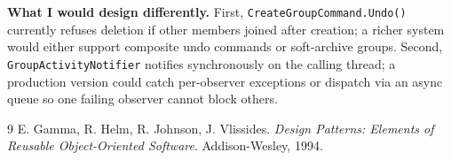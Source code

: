 \documentclass{utmreport}
\providecommand{\passthrough}[1]{#1}
\begin{document}
\textbf{What I would design differently.} First, \passthrough{\lstinline!CreateGroupCommand.Undo()!} currently refuses deletion if other members joined after creation; a richer system would either support composite undo commands or soft-archive groups. Second, \passthrough{\lstinline!GroupActivityNotifier!} notifies synchronously on the calling thread; a production version could catch per-observer exceptions or dispatch via an async queue so one failing observer cannot block others.


\begin{thebibliography}{9}
 E. Gamma, R. Helm, R. Johnson, J. Vlissides. \textit{Design Patterns: Elements of Reusable Object-Oriented Software}. Addison-Wesley, 1994.
\end{thebibliography}
\end{document}
